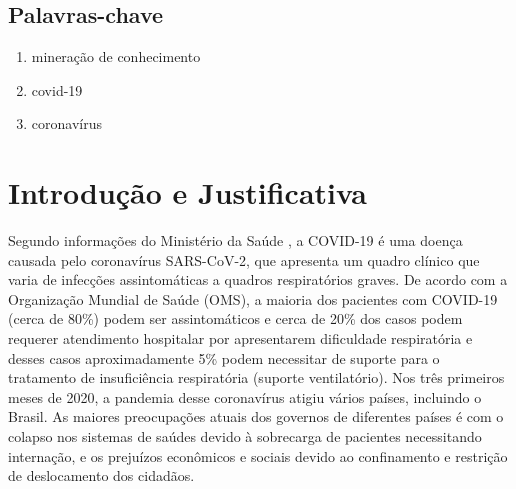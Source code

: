 \documentclass[
	12pt,				%
	a4paper,			%
	english,			%
	brazil,				%
	]{article}
\begin{document}
    	
    \subsection{Palavras-chave}

        \begin{enumerate}
        	\item minera\c c\~ ao de conhecimento
        	\item covid-19
        	\item coronav\' irus
        \end{enumerate}

\section{Introdu\c c\~ ao e Justificativa}


Segundo informa\c c\~ oes do Minist\' erio da Sa\' ude \cite{brasil20online}, a COVID-19 \' e uma doen\c ca causada pelo coronav\' irus SARS-CoV-2, que apresenta um quadro cl\' inico que varia de infec\c c\~ oes assintom\' aticas a quadros respirat\' orios graves. De acordo com a Organiza\c c\~ ao Mundial de Sa\' ude (OMS), a maioria dos pacientes com COVID-19 (cerca de 80\%) podem ser assintom\' aticos e cerca de 20\% dos casos podem requerer atendimento hospitalar por apresentarem dificuldade respirat\' oria e desses casos aproximadamente 5\% podem necessitar de suporte para o tratamento de insufici\^ encia respirat\' oria (suporte ventilat\' orio). Nos tr\^ es primeiros meses de 2020, a pandemia desse coronav\' irus atigiu v\' arios pa\' ises, incluindo o Brasil. As maiores preocupa\c c\~ oes atuais dos governos de diferentes pa\' ises \' e com o colapso nos sistemas de sa\' udes devido à sobrecarga de pacientes necessitando interna\c c\~ ao, e os preju\' izos econômicos e sociais devido ao confinamento e restri\c c\~ ao de deslocamento dos cidad\~ aos.
\end{document}
